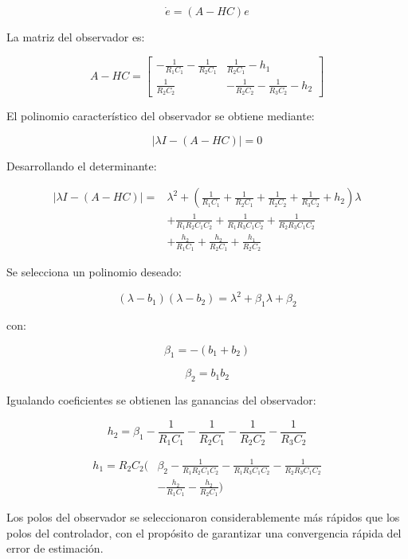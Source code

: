 \documentclass[12pt,letterpaper,twoside]{article}
\begin{document}
\begin{equation}
\dot{e} = (A-HC)e
\end{equation}

La matriz del observador es:

\begin{equation}
A-HC =
\begin{bmatrix}
-\frac{1}{R_1C_1}-\frac{1}{R_2C_1} &
\frac{1}{R_2C_1}-h_1 \\
\frac{1}{R_2C_2} &
-\frac{1}{R_2C_2}-\frac{1}{R_3C_2}-h_2
\end{bmatrix}
\end{equation}

El polinomio característico del observador se obtiene mediante:

\begin{equation}
\left| \lambda I-(A-HC) \right| = 0
\end{equation}

Desarrollando el determinante:

\begin{equation}
\begin{aligned}
\left| \lambda I-(A-HC) \right| =
&\lambda^2
+
\left(
\frac{1}{R_1C_1}
+
\frac{1}{R_2C_1}
+
\frac{1}{R_2C_2}
+
\frac{1}{R_3C_2}
+
h_2
\right)\lambda \\
&+
\frac{1}{R_1R_2C_1C_2}
+
\frac{1}{R_1R_3C_1C_2}
+
\frac{1}{R_2R_3C_1C_2}\\
&+
\frac{h_2}{R_1C_1}
+
\frac{h_2}{R_2C_1}
+
\frac{h_1}{R_2C_2}
\end{aligned}
\end{equation}

Se selecciona un polinomio deseado:

\begin{equation}
(\lambda-b_1)(\lambda-b_2)
=
\lambda^2 + \beta_1\lambda + \beta_2
\end{equation}

con:

\begin{equation}
\beta_1 = -(b_1+b_2)
\end{equation}

\begin{equation}
\beta_2 = b_1b_2
\end{equation}

Igualando coeficientes se obtienen las ganancias del observador:

\begin{equation}
h_2 =
\beta_1
-
\frac{1}{R_1C_1}
-
\frac{1}{R_2C_1}
-
\frac{1}{R_2C_2}
-
\frac{1}{R_3C_2}
\end{equation}

\begin{equation}
\begin{aligned}
h_1 = R_2C_2
\Bigg(
&\beta_2
-
\frac{1}{R_1R_2C_1C_2}
-
\frac{1}{R_1R_3C_1C_2}
-
\frac{1}{R_2R_3C_1C_2}\\
&-
\frac{h_2}{R_1C_1}
-
\frac{h_2}{R_2C_1}
\Bigg)
\end{aligned}
\end{equation}

Los polos del observador se seleccionaron considerablemente más rápidos que los polos del controlador, con el propósito de garantizar una convergencia rápida del error de estimación.
\end{document}
